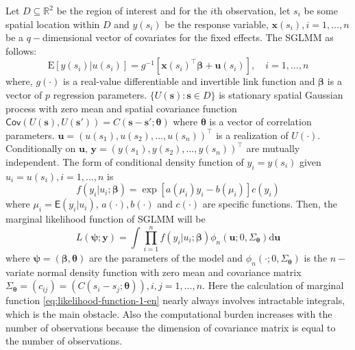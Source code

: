 \documentclass[12pt,a4paper,UTF8,twoside]{book}
\begin{document}
Let \(D \subseteq \mathbb{R}^2\) be the region of interest and for the
\(i\)th observation, let \(s_i\) be some spatial location within \(D\)
and \(y(s_i)\) be the response variable,
\(\mathbf{x}(s_i), i = 1, \ldots, n\) be a \(q-\)dimensional vector of
covariates for the fixed effects. The SGLMM as follows: \[
\mathrm{E}[y(s_i)|u(s_i)] = g^{-1}[\mathbf{x}(s_i)^{\top}\boldsymbol{\beta} + \mathbf{u}(s_i)], \quad i = 1, \ldots, n
\] \noindent where, \(g(\cdot)\) is a real-value differentiable and
invertible link function and \(\boldsymbol{\beta}\) is a vector of \(p\)
regression parameters. \(\{U(\mathbf{s}): \mathbf{s} \in D\}\) is
stationary spatial Gaussian process with zero mean and spatial
covariance function
\(\mathsf{Cov}(U(\mathbf{s}),U(\mathbf{s}')) = C(\mathbf{s} - \mathbf{s}'; \boldsymbol{\theta})\)
where \(\boldsymbol{\theta}\) is a vector of correlation parameters.
\(\mathbf{u} = (u(s_1),u(s_2),\ldots,u(s_n))^{\top}\) is a realization
of \(U(\cdot)\). Conditionally on \(\mathbf{u}\),
\(\mathbf{y} = (y(s_1),y(s_2),\ldots,y(s_n))^{\top}\) are mutually
independent. The form of conditional density function of
\(y_i = y(s_i)\) given \(u_i = u(s_i), i = 1, \ldots, n\) is \[
f(y_i|u_i;\boldsymbol{\beta}) = \exp[a(\mu_i)y_i - b(\mu_i)]c(y_i)
\] \noindent where \(\mu_i = \mathsf{E}(y_i|u_i)\),
\(a(\cdot),b(\cdot)\) and \(c(\cdot)\) are specific functions. Then, the
marginal likelihood function of SGLMM will be \begin{equation}
L(\boldsymbol{\psi};\mathbf{y}) = \int \prod_{i=1}^{n} f(y_i|u_i;\boldsymbol{\beta})\phi_{n}(\mathbf{u};0,\Sigma_{\boldsymbol{\theta}})\mathrm{d}\mathbf{u} \label{eq:likelihood-function-1-en}
\end{equation} \noindent where
\(\boldsymbol{\psi} = (\boldsymbol{\beta},\boldsymbol{\theta})\) are the
parameters of the model and
\(\phi_{n}(\cdot;0,\Sigma_{\boldsymbol{\theta}})\) is the \(n-\)variate
normal density function with zero mean and covariance matrix
\(\Sigma_{\boldsymbol{\theta}} = (c_{ij}) = (C(s_i - s_j; \boldsymbol{\theta})), i,j = 1, \ldots, n\).
Here the calculation of marginal function
\eqref{eq:likelihood-function-1-en} nearly always involves intractable
integrals, which is the main obstacle. Also the computational burden
increases with the number of observations because the dimension of
covariance matrix is equal to the number of observations.
\end{document}
